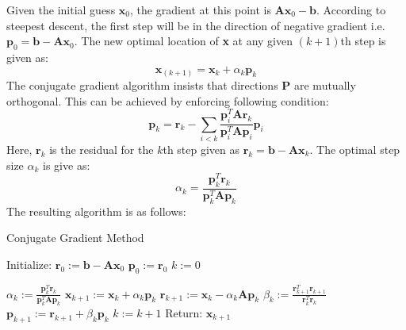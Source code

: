 \documentclass[sigplan,screen]{acmart}
\begin{document}
Given the initial guess $\textbf{x}_0$, the gradient at this point is $\textbf{Ax}_0-\textbf{b}$. According to steepest descent, the first step will be in the direction of negative gradient i.e. $\textbf{p}_0= \textbf{b}-\textbf{Ax}_0$. The new optimal location of \textbf{x} at any given $(k+1)$th step is given as:
\begin{equation}
\textbf{x}_{(k+1)}=\textbf{x}_k+\alpha_k\textbf{p}_k
\end{equation}
The conjugate gradient algorithm insists that directions $\textbf{P}$ are mutually orthogonal. This can be achieved by enforcing following condition: 
\begin{equation}
\textbf{p}_k= \textbf{r}_k-\sum_{i<k}\frac{\textbf{p}_i^{T}\textbf{A}\textbf{r}_k}{\textbf{p}_i^{T}\textbf{A}\textbf{p}_i}\textbf{p}_i
\end{equation}
Here, $\textbf{r}_k$ is the residual for the $k$th step given as $\textbf{r}_k=\textbf{b}-\textbf{Ax}_k$. The optimal step size $\alpha_k$ is give as:
\begin{equation}
\alpha_k=\frac{\textbf{p}^T_k\textbf{r}_k}{\textbf{p}^T_k\textbf{A}\textbf{p}_k}
\end{equation}
The resulting algorithm is as follows:

\begin{algorithm}
	\caption{Conjugate Gradient Method}
	\begin{algorithmic}[1]
		
		\State Initialize:
		\State $\textbf{r}_0 := \textbf{b}-\textbf{Ax}_0$
		\State $\textbf{p}_0 := \textbf{r}_0$
		\State $k := 0$
		
		\State $\alpha_k := \frac{\textbf{p}^T_k\textbf{r}_k}{\textbf{p}^T_k\textbf{A}\textbf{p}_k}$
		\State $\textbf{x}_{k+1} := \textbf{x}_k+\alpha_k\textbf{p}_k $
		\State $\textbf{r}_{k+1} := \textbf{x}_k-\alpha_k\textbf{A}\textbf{p}_k $
		\State $ \beta_k := \frac{\textbf{r}^T_{k+1}\textbf{r}_{k+1}}{\textbf{r}^T_{k}\textbf{r}_{k}}$
		\State $\textbf{p}_{k+1} := \textbf{r}_{k+1}+\beta_k\textbf{p}_k $
		\State $k := k+1$
		\EndWhile  
		\State Return: $\textbf{x}_{k+1}$    
		
	\end{algorithmic}
\end{algorithm}\label{algo}
\end{document}

